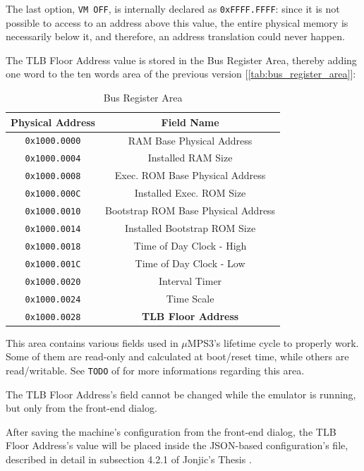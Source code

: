 \documentclass[12pt,a4paper,openright,twoside]{report}
\begin{document}
  The last option, \texttt{VM OFF}, is internally declared as \texttt{0xFFFF.FFFF}: since it is not possible to access to an address above this value, the entire physical memory is necessarily below it, and therefore, an address translation could never happen.
 
	The TLB Floor Address value is stored in the Bus Register Area, thereby adding one word to the ten words area of the previous version [\autoref{tab:bus_register_area}]:
	\begin{table}[h]
	\centering
  \begin{tabular}{|c|c|}
  \hline
  Physical Address & Field Name \\ \hline\hline
  \texttt{0x1000.0000} & RAM Base Physical Address \\ \hline
  \texttt{0x1000.0004} & Installed RAM Size \\ \hline
  \texttt{0x1000.0008} & Exec. ROM Base Physical Address \\ \hline
  \texttt{0x1000.000C} & Installed Exec. ROM Size \\ \hline
  \texttt{0x1000.0010} & Bootstrap ROM Base Physical Address \\ \hline
  \texttt{0x1000.0014} & Installed Bootstrap ROM Size \\ \hline
  \texttt{0x1000.0018} & Time of Day Clock - High \\ \hline
  \texttt{0x1000.001C} & Time of Day Clock - Low \\ \hline
  \texttt{0x1000.0020} & Interval Timer \\ \hline
  \texttt{0x1000.0024} & Time Scale \\ \hline
  \texttt{0x1000.0028} & \textbf{TLB Floor Address} \\ \hline
  \end{tabular}
  \caption{Bus Register Area}
  \label{tab:bus_register_area}
  \end{table}
  
  This area contains various fields used in $\mu$MPS3's lifetime cycle to properly work.
  Some of them are read-only and calculated at boot/reset time, while others are read/writable.
  See \texttt{TODO} of \cite{pops} for more informations regarding this area.
  
  The TLB Floor Address's field cannot be changed while the emulator is running, but only from the front-end dialog.
  
  After saving the machine's configuration from the front-end dialog, the TLB Floor Address's value will be placed inside the JSON-based configuration's file, described in detail in subsection 4.2.1 of Jonjic's Thesis \cite{tjonjic}.
  
\end{document}

